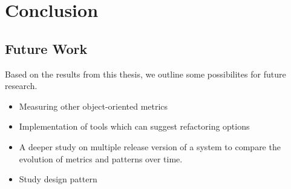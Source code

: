 
\chapter{Conclusion}

\section{Future Work}
Based on the results from this thesis, we outline some possibilites for future research.

\begin{itemize}
	\item Measuring other object-oriented metrics
	\item Implementation of tools which can suggest refactoring options
	\item A deeper study on multiple release version of a system to compare the evolution of metrics and patterns over time.
	\item Study design pattern
\end{itemize}
